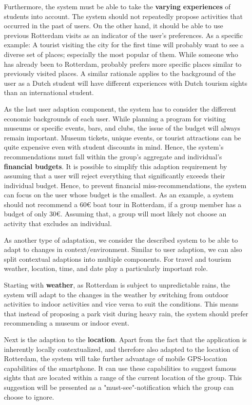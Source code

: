 \documentclass[11pt,a4paper,oneside]{article}
\begin{document}
Furthermore, the system must be able to take the \textbf{varying experiences} of students into account. The system should not repeatedly propose activities that occurred in the past of users. On the other hand, it should be able to use previous Rotterdam visits as an indicator of the user's preferences. As a specific example: A tourist visiting the city for the first time will probably want to see a diverse set of places; especially the most popular of them. While someone who has already been to Rotterdam, probably prefers more specific places similar to previously visited places.\cite{predicting} A similar rationale applies to the background of the user as a Dutch student will have different experiences with Dutch tourism sights than an international student. 

As the last user adaption component, the system has to consider the different economic backgrounds of each user. While planning a program for visiting museums or specific events, bars, and clubs, the issue of the budget will always remain important. Museum tickets, unique events, or tourist attractions can be quite expensive even with student discounts in mind. Hence, the system's recommendations must fall within the group's aggregate and individual's \textbf{financial budgets}. It is possible to simplify this adaption requirement by assuming that a user will reject everything that significantly exceeds their individual budget. Hence, to prevent financial miss-recommendations, the system can focus on the user whose budget is the smallest. As an example, a system should not recommend a 60€ boat tour in Rotterdam, if a group member has a budget of only 30€. Assuming that, a  group will most likely not choose an activity that excludes an individual.

As another type of adaptation, we consider the described system to be able to adapt to changes in context/environment. Similar to user adaption, we can also split contextual adaptions into multiple components. For travel and tourism weather, location, time, and date play a particularly important role.

Starting with \textbf{weather}, as Rotterdam is subject to unpredictable rains, the system will adapt to the changes in the weather by switching from outdoor activities to indoor activities and vice versa to suit the conditions.\cite{creemers2015meteorological} This means that instead of proposing a park visit during heavy rain, the system should prefer recommending a museum or indoor event.   

Next is the adaption to the \textbf{location}. Apart from the fact that the application is inherently locally contextualized, and therefore also adapted to the location of Rotterdam, the system will take further advantage of mobile GPS-location capabilities of the smartphone. It can use these capabilities to suggest famous sights that are located within a range of the current location of the group. This suggestion will be presented as a "must-see"-notification which the group can choose to ignore. 
\end{document}
